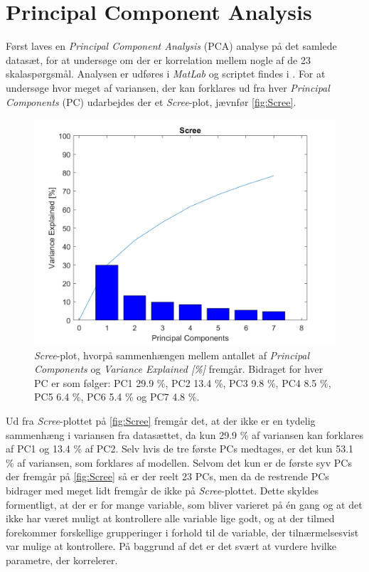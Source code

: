 \section{Principal Component Analysis}
\label{DatabehandlingPCA}
%
Først laves en \textit{Principal Component Analysis} (PCA) analyse på det samlede datasæt, for at undersøge om der er korrelation mellem nogle af de 23 skalaspørgsmål. Analysen er udføres i \textit{MatLab} og scriptet findes i . For at undersøge hvor meget af variansen, der kan forklares ud fra hver \textit{Principal Components} (PC) udarbejdes der et \textit{Scree}-plot, jævnfør \autoref{fig:Scree}. 
%
\begin{figure}[H]
\centering
\includegraphics[width=\textwidth]{Figure/DatabehandlingSkalaer/PCAfigures/Scree.png}
\caption{\textit{Scree}-plot, hvorpå sammenhængen mellem antallet af \textit{Principal Components} og \textit{Variance Explained [\%]} fremgår. Bidraget for hver PC er som følger: PC1 29.9 \%, PC2 13.4 \%, PC3 9.8 \%, PC4 8.5 \%, PC5 6.4 \%, PC6 5.4 \% og PC7 4.8 \%.}
\label{fig:Scree}
\end{figure}
\noindent
%
Ud fra \textit{Scree}-plottet på \autoref{fig:Scree} fremgår det, at der ikke er en tydelig sammenhæng i variansen fra datasættet, da kun 29.9 \% af variansen kan forklares af PC1 og 13.4 \% af PC2. Selv hvis de tre første PCs medtages, er det kun 53.1 \% af variansen, som forklares af modellen. Selvom det kun er de første syv PCs der fremgår på \autoref{fig:Scree} så er der reelt 23 PCs, men da de restrende PCs bidrager med meget lidt fremgår de ikke på \textit{Scree}-plottet. Dette skyldes formentligt, at der er for mange variable, som bliver varieret på én gang og at det ikke har været muligt at kontrollere alle variable lige godt, og at der tilmed forekommer forskellige grupperinger i forhold til de variable, der tilnærmelsesvist var mulige at kontrollere. På baggrund af det er det svært at vurdere hvilke parametre, der korrelerer. 
